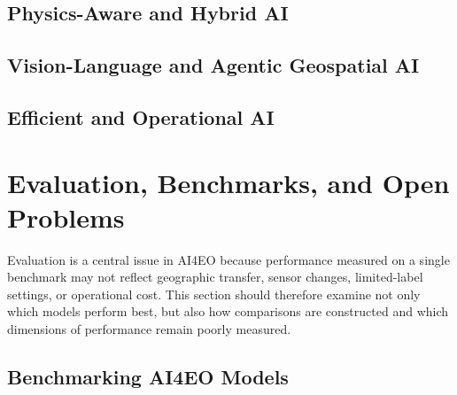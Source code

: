 \documentclass[
    11pt,
    a4paper,
    parskip=half,
    bibliography=totoc,
    numbers=noenddot
]{scrartcl}
\begin{document}
\subsection{Physics-Aware and Hybrid AI}


\subsection{Vision-Language and Agentic Geospatial AI}


\subsection{Efficient and Operational AI}


\section{Evaluation, Benchmarks, and Open Problems}

Evaluation is a central issue in AI4EO because performance measured on a
single benchmark may not reflect geographic transfer, sensor changes,
limited-label settings, or operational cost. This section should
therefore examine not only which models perform best, but also how
comparisons are constructed and which dimensions of performance remain
poorly measured.

\subsection{Benchmarking AI4EO Models}

\end{document}
